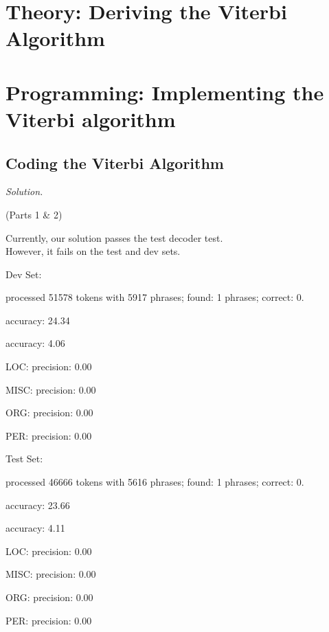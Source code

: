 \documentclass[12pt]{article}
\newcommand\sol[1]{\begin{mdframed}
\emph{Solution.} #1
\end{mdframed}}
\begin{document}
\section{Theory: Deriving the Viterbi Algorithm}


\section{Programming: Implementing the Viterbi algorithm }

\subsection{Coding the Viterbi Algorithm}

\sol{
\item (Parts 1 & 2)


\item Currently, our solution passes the test decoder test.\\ However, it fails on the test and dev sets.

\item Dev Set:
\item processed 51578 tokens with 5917 phrases; found: 1 phrases; correct: 0.
\item accuracy:  24.34%
\item accuracy:   4.06%
\item LOC: precision:   0.00%
\item MISC: precision:   0.00%
\item ORG: precision:   0.00%
\item PER: precision:   0.00%

\item

\item Test Set:
\item processed 46666 tokens with 5616 phrases; found: 1 phrases; correct: 0.
\item accuracy:  23.66%
\item accuracy:   4.11%
\item LOC: precision:   0.00%
\item MISC: precision:   0.00%
\item ORG: precision:   0.00%
\item PER: precision:   0.00%
}
\end{document}
